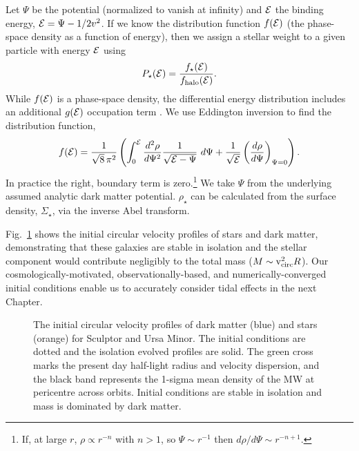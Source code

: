 Let \(\Psi\) be the potential (normalized to vanish at infinity) and
\({\cal E}\) the binding energy, \({\cal E} = \Psi - 1/2 v^2\). If we
know the distribution function \(f({\cal E})\) (the phase-space density
as a function of energy), then we assign a stellar weight to a given
particle with energy \({\cal E}\) using \begin{equation}{
P_\star({\cal E}) = \frac{f_\star({\cal E})}{f_{\rm halo}({\cal E})}.
}\end{equation} While \(f({\cal E})\) is a phase-space density, the
differential energy distribution includes an additional \(g({\cal E})\)
occupation term \citep{BT1987}. We use Eddington inversion to find the
distribution function, \citep[eq. 4-140b in][]{BT1987} \begin{equation}{
f({\cal E}) = \frac{1}{\sqrt{8}\, \pi^2}\left( \int_0^{\cal E} \frac{d^2\rho}{d\Psi^2} \frac{1}{\sqrt{{\cal E} - \Psi}}\ d\Psi + \frac{1}{\sqrt{\cal E}} \left(\frac{d\rho}{d\Psi}\right)_{\Psi=0} \right).
}\end{equation} In practice the right, boundary term is zero.\footnote{If,
  at large \(r\), \(\rho \propto r^{-n}\) with \(n>1\), so
  \(\Psi \sim r^{-1}\) then \(d\rho / d\Psi \sim r^{-n+1}\).} We take
\(\Psi\) from the underlying assumed analytic dark matter potential.
\(\rho_\star\) can be calculated from the surface density,
\(\Sigma_\star\), via the inverse Abel transform.

Fig.~\ref{fig:scl_umi_initial_isolation} shows the initial circular
velocity profiles of stars and dark matter, demonstrating that these
galaxies are stable in isolation and the stellar component would
contribute negligibly to the total mass (\(M \sim {\rm v}_{\rm circ}^2 R\)).
Our cosmologically-motivated, observationally-based, and
numerically-converged initial conditions enable us to accurately
consider tidal effects in the next Chapter.

\begin{figure}
\centering
{}
\caption[Initial halo velocity profiles]{The initial circular velocity
profiles of dark matter (blue) and stars (orange) for Sculptor and Ursa
Minor. The initial conditions are dotted and the isolation evolved
profiles are solid. The green cross marks the present day half-light
radius and velocity dispersion, and the black band represents the
1-sigma mean density of the MW at pericentre across orbits. Initial
conditions are stable in isolation and mass is dominated by dark
matter.}\label{fig:scl_umi_initial_isolation}
\end{figure}
